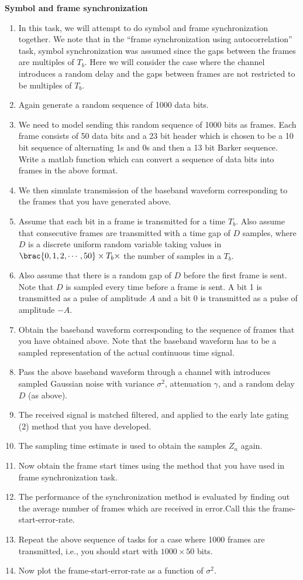 \newpage
\myhrule
\noindent
\textbf{Symbol and frame synchronization}
\begin{enumerate}
\item In this task, we will attempt to do symbol and frame synchronization together. We note that in the ``frame synchronization using autocorrelation'' task, symbol synchronization was assumed since the gaps between the frames are multiples of $T_{b}$. Here we will consider the case where the channel introduces a random delay and the gaps between frames are not restricted to be multiples of $T_{b}$.
\item Again generate a random sequence of 1000 data bits. 
\item We need to model sending this random sequence of 1000 bits as frames. Each frame consists of 50 data bits and a 23 bit header which is chosen to be a 10 bit sequence of alternating 1s and 0s and then a 13 bit Barker sequence. Write a matlab function which can convert a sequence of data bits into frames in the above format.
\item We then simulate transmission of the baseband waveform corresponding to the frames that you have generated above.
\item Assume that each bit in a frame is transmitted for a time $T_{b}$. Also assume that consecutive frames are transmitted with a time gap of $D$ samples, where $D$ is a discrete uniform random variable taking values in $\brac{0,1,2,\cdots,50} \times T_{b} \times$ the number of samples in a $T_{b}$. \item Also assume that there is a random gap of $D$ before the first frame is sent. Note that $D$ is sampled every time before a frame is sent. A bit 1 is transmitted as a pulse of amplitude $A$ and a bit 0 is transmitted as a pulse of amplitude $-A$.
\item Obtain the baseband waveform corresponding to the sequence of frames that you have obtained above. Note that the baseband waveform has to be a sampled representation of the actual continuous time signal.
\item Pass the above baseband waveform through a channel with introduces sampled Gaussian noise with variance $\sigma^{2}$, attenuation $\gamma$, and a random delay $D$ (as above).\
\item The received signal is matched filtered, and applied to the early late gating (2) method that you have developed. 
\item The sampling time estimate is used to obtain the samples $Z_{n}$ again. 
\item Now obtain the frame start times using the method that you have used in frame synchronization task.
\item The performance of the synchronization method is evaluated by finding out the average number of frames which are received in error.Call this the frame-start-error-rate.
\item Repeat the above sequence of tasks for a case where 1000 frames are transmitted, i.e., you should start with $1000 \times 50$ bits.
\item Now plot the frame-start-error-rate as a function of $\sigma^{2}$.
\end{enumerate}
